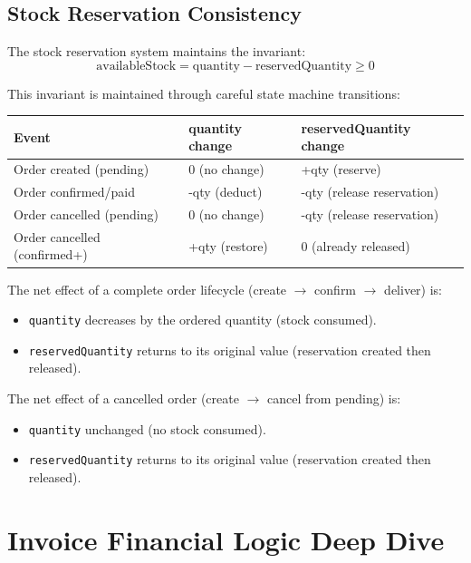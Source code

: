 \documentclass[12pt,a4paper]{report}
\begin{document}
\subsection{Stock Reservation Consistency}

The stock reservation system maintains the invariant:
\[
\text{availableStock} = \text{quantity} - \text{reservedQuantity} \geq 0
\]

This invariant is maintained through careful state machine transitions:

\begin{center}
\begin{tabularx}{\textwidth}{lXX}
  \toprule
  \textbf{Event} & \textbf{quantity change} & \textbf{reservedQuantity change} \\
  \midrule
  Order created (pending)    & 0 (no change)    & +qty (reserve) \\
  Order confirmed/paid       & -qty (deduct)    & -qty (release reservation) \\
  Order cancelled (pending)  & 0 (no change)    & -qty (release reservation) \\
  Order cancelled (confirmed+) & +qty (restore) & 0 (already released) \\
  \bottomrule
\end{tabularx}
\end{center}

The net effect of a complete order lifecycle (create $\to$ confirm $\to$ deliver) is:
\begin{itemize}[leftmargin=1.5em]
  \item \texttt{quantity} decreases by the ordered quantity (stock consumed).
  \item \texttt{reservedQuantity} returns to its original value (reservation created then released).
\end{itemize}

The net effect of a cancelled order (create $\to$ cancel from pending) is:
\begin{itemize}[leftmargin=1.5em]
  \item \texttt{quantity} unchanged (no stock consumed).
  \item \texttt{reservedQuantity} returns to its original value (reservation created then released).
\end{itemize}

\section{Invoice Financial Logic Deep Dive}
\end{document}
